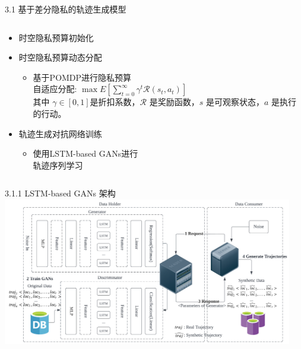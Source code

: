 \documentclass{sintefbeamer}
\begin{document}
\begin{frame}{3.1 基于差分隐私的轨迹生成模型}
\begin{columns}
\begin{column}{0.5\textwidth}
\begin{itemize}
  \item[Step 2] 时空隐私预算初始化
  \item[Step 3] 时空隐私预算动态分配
  	\begin{itemize}
  	\item 基于POMDP进行隐私预算\\自适应分配:
  	$\max E\left[\sum_{t=0}^{\infty} \gamma^t \mathcal{R}\left(s_t, a_t\right)\right]$\\
  	其中 $\gamma \in [0,1]$是折扣系数，$\mathcal{R}$ 是奖励函数，$s$ 是可观察状态，$a$ 是执行的行动。
  	\end{itemize}
  	
  \item[Step 4] 轨迹生成对抗网络训练
  	\begin{itemize}\item 使用LSTM-based GANs进行 \\轨迹序列学习 \end{itemize}
 \end{itemize}
\end{column}
\end{columns}
\end{frame}

\begin{frame}{3.1.1 LSTM-based GANs 架构}
\includegraphics[width=0.95\textwidth]{images/survey1-1}
\end{frame}
\end{document}
